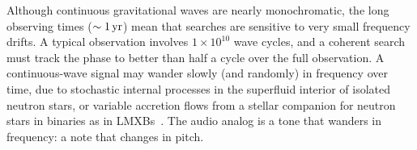\documentclass[paper-main.tex]{subfiles}
\begin{document}

Although continuous gravitational waves are nearly monochromatic, the long observing times ($\sim 1\,{\rm yr}$) mean that searches are sensitive to very small frequency drifts. 
A typical observation involves $1 \times 10^{10}$ wave cycles, and a coherent search must track the phase to better than half a cycle over the full observation. 
A continuous-wave signal may wander slowly (and randomly) in frequency over time, due to stochastic internal processes in the superfluid interior of isolated neutron stars\cite{MelatosDouglassSimula:2015,Jones:2010}, or variable accretion flows from a stellar companion for neutron stars in binaries as in LMXBs~\cite{BildstenTB:1998}. 
The audio analog is a tone that wanders in frequency: a note that changes in pitch. 
\end{document}
